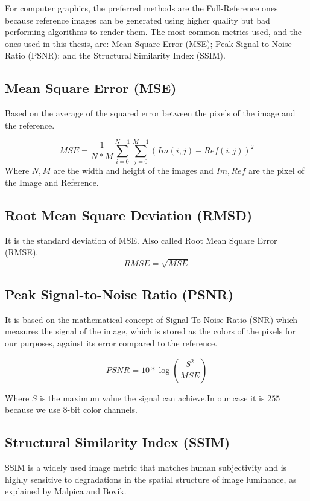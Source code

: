 \documentclass{cslthse-msc}
\begin{document}
For computer graphics, the preferred methods are the Full-Reference ones because reference images can be generated using higher quality but bad performing algorithms to render them. The most common metrics used, and the ones used in this thesis, are: Mean Square Error (MSE); Peak Signal-to-Noise Ratio (PSNR); and the Structural Similarity Index (SSIM).

\subsection{Mean Square Error (MSE)}
Based on the average of the squared error between the pixels of the image and the reference.

\begin{equation}\label{eq:mse}
	MSE=\frac{1}{N*M}\sum\limits_{i=0}^{N-1}\sum\limits_{j=0}^{M-1}(Im(i,j)-Ref(i,j))^2
\end{equation}
Where $N,M$ are the width and height of the images and $Im,Ref$ are the pixel of the Image and Reference.

\subsection{Root Mean Square Deviation (RMSD)}
It is the standard deviation of MSE. Also called Root Mean Square Error (RMSE).
\begin{equation}\label{eq:rmse}
RMSE=\sqrt{MSE}
\end{equation}

\subsection{Peak Signal-to-Noise Ratio (PSNR)}
It is based on the mathematical concept of Signal-To-Noise Ratio (SNR) which measures the signal of the image, which is stored as the colors of the pixels for our purposes, against its error compared to the reference. \cite{Yusra2012}

\begin{equation}\label{eq:psnr}
PSNR=10*\log\left(\frac{S^2}{MSE}\right)
\end{equation}

Where $S$ is the maximum value the signal can achieve.In our case it is $255$ because we use 8-bit color channels. 

\subsection{Structural Similarity Index (SSIM)}
SSIM is a widely used image metric that matches human subjectivity and is highly sensitive to degradations in the spatial structure of image luminance, as explained by Malpica and Bovik. \cite{Malpica2009}
\end{document}
